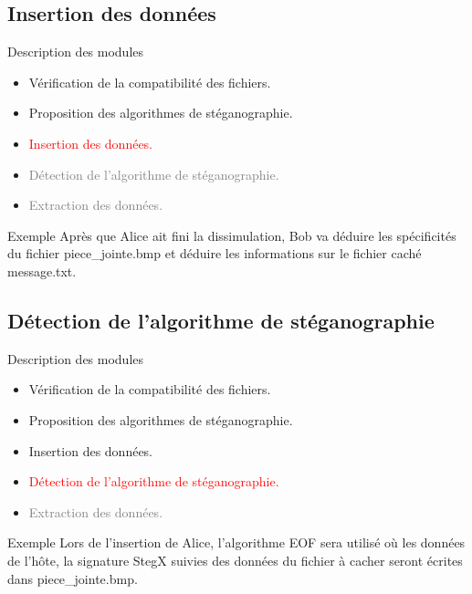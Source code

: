 \documentclass{beamer}
\begin{document}
  \subsection{Insertion des données}
  \begin{frame} %
	\begin{block}{Description des modules}
	\begin{itemize}
	[circle]
	\item Vérification de la compatibilité des fichiers.
	\item Proposition des algorithmes de stéganographie.
	\item \textcolor{red} {Insertion des données.}
	\item \textcolor{gray} {Détection de l'algorithme de stéganographie.}
	\item \textcolor{gray} {Extraction des données.}
	\end{itemize}
	\end{block}
	
	\begin{exampleblock}{Exemple} 
	Après que Alice ait fini la dissimulation, Bob va déduire les spécificités
	du fichier piece\_jointe.bmp et déduire les informations sur le fichier 
	caché message.txt. 
	\end{exampleblock}
  \end{frame}
  
	\subsection{Détection de l'algorithme de stéganographie}
  \begin{frame} %
	\begin{block}{Description des modules}
	\begin{itemize}
	[circle]
	\item Vérification de la compatibilité des fichiers.
	\item Proposition des algorithmes de stéganographie.
	\item Insertion des données.
	\item \textcolor{red} {Détection de l'algorithme de stéganographie.}
	\item \textcolor{gray} {Extraction des données.}
	\end{itemize}
	\end{block}
	
	\begin{exampleblock}{Exemple} 
	Lors de l'insertion de Alice, l'algorithme EOF sera utilisé où 
	les données de l'hôte, la signature StegX suivies des données du fichier 
	à cacher seront écrites dans piece\_jointe.bmp. 
	\end{exampleblock}
  \end{frame}
  
\end{document}
